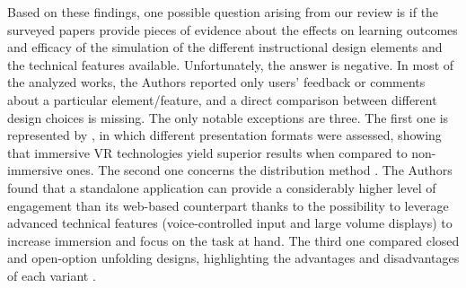 Based on these findings, one possible question arising from our review is if the surveyed papers provide pieces of evidence about the effects on learning outcomes and efficacy of the simulation of the different instructional design elements and the technical features available. 
Unfortunately, the answer is negative. In most of the analyzed works, the Authors reported only users' feedback or comments about a particular element/feature, and a direct comparison between different design choices is missing. The only notable exceptions are three. The first one is represented by \cite{ochs2019training}, in which  different presentation formats were assessed, showing that immersive VR technologies yield superior results when compared to non-immersive ones. The second one concerns the distribution method  \cite{maicher2017developing}. The Authors found that a standalone application can provide a considerably higher level of engagement than its web-based counterpart thanks to the possibility to leverage advanced technical features (voice-controlled input and large volume displays) to increase immersion and focus on the task at hand. The third one compared closed and open-option unfolding designs, highlighting the advantages and disadvantages of each variant \cite{hirumi2016advancing}.




